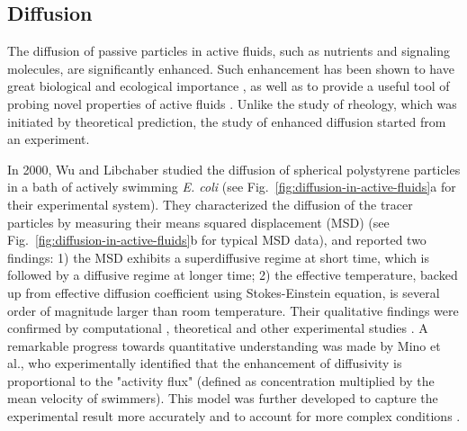 \subsection{Diffusion}
\label{sec:diffusion}
The diffusion of passive particles in active fluids, such as nutrients and signaling molecules, are significantly enhanced. Such enhancement has been shown to have great biological and ecological importance \cite{Wu2000, Kurtuldu2011, Morozov2014}, as well as to provide a useful tool of probing novel properties of active fluids \cite{Squires2010}. Unlike the study of rheology, which was initiated by theoretical prediction, the study of enhanced diffusion started from an experiment.

In 2000, Wu and Libchaber studied the diffusion of spherical polystyrene particles in a bath of actively swimming \textit{E. coli} \cite{Wu2000} (see Fig.~\ref{fig:diffusion-in-active-fluids}a for their experimental system). They characterized the diffusion of the tracer particles by measuring their means squared displacement (MSD) (see Fig.~\ref{fig:diffusion-in-active-fluids}b for typical MSD data), and reported two findings: 1) the MSD exhibits a superdiffusive regime at short time, which is followed by a diffusive regime at longer time; 2) the effective temperature, backed up from effective diffusion coefficient using Stokes-Einstein equation, is several order of magnitude larger than room temperature. Their qualitative findings were confirmed by computational \cite{Underhill2008, Lin2011}, theoretical \cite{Golestanian2009} and other experimental studies
\cite{Chen2007, Leptos2009, Mino2011, Kurtuldu2011, Patteson2016}. A remarkable progress towards quantitative understanding was made by Mino et al., who experimentally identified that the enhancement of diffusivity is proportional to the "activity flux" (defined as concentration multiplied by the mean velocity of swimmers). This model was further developed to capture the experimental result more accurately and to account for more complex conditions \cite{Mino2013, Kasyap2014, Morozov2014}.

